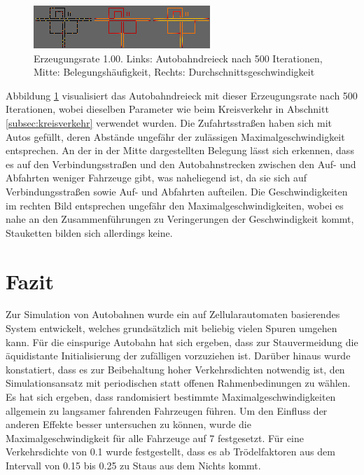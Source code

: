\documentclass[10pt, a4paper]{article}
\begin{document}
\begin{figure}[h!]
	\centering
	\includegraphics[width=\textwidth]{img/interchangeTrumpet_100}
	\caption{Erzeugungsrate 1.00. Links: Autobahndreieck nach 500 Iterationen, Mitte: Belegungshäufigkeit, Rechts: Durchschnittsgeschwindigkeit}
	\label{fig:interchangeTrumpet100}
\end{figure}

Abbildung \ref{fig:interchangeTrumpet100} visualisiert das Autobahndreieck mit dieser Erzeugungsrate nach 500 Iterationen, wobei dieselben Parameter wie beim Kreisverkehr in Abschnitt \ref{subsec:kreisverkehr} verwendet wurden. Die Zufahrtsstraßen haben sich mit Autos gefüllt, deren Abstände ungefähr der zulässigen Maximalgeschwindigkeit entsprechen. An der in der Mitte dargestellten Belegung lässt sich erkennen, dass es auf den Verbindungsstraßen und den Autobahnstrecken zwischen den Auf- und Abfahrten weniger Fahrzeuge gibt, was naheliegend ist, da sie sich auf Verbindungsstraßen sowie Auf- und Abfahrten aufteilen. Die Geschwindigkeiten im rechten Bild entsprechen ungefähr den Maximalgeschwindigkeiten, wobei es nahe an den Zusammenführungen zu Veringerungen der Geschwindigkeit kommt, Stauketten bilden sich allerdings keine.

\section{Fazit}
\label{sec:fazit}

Zur Simulation von Autobahnen wurde ein auf Zellularautomaten basierendes System entwickelt, welches grundsätzlich mit beliebig vielen Spuren umgehen kann. Für die einspurige Autobahn hat sich ergeben, dass zur Stauvermeidung die äquidistante Initialisierung der zufälligen vorzuziehen ist. Darüber hinaus wurde konstatiert, dass es zur Beibehaltung hoher Verkehrsdichten notwendig ist, den Simulationsansatz mit periodischen statt offenen Rahmenbedinungen zu wählen. Es hat sich ergeben, dass randomisiert bestimmte Maximalgeschwindigkeiten allgemein zu langsamer fahrenden Fahrzeugen führen. Um den Einfluss der anderen Effekte besser untersuchen zu können, wurde die Maximalgeschwindigkeit für alle Fahrzeuge auf 7 festgesetzt. Für eine Verkehrsdichte von 0.1 wurde festgestellt, dass es ab Trödelfaktoren aus dem Intervall von 0.15 bis 0.25 zu Staus aus dem Nichts kommt.
\end{document}
